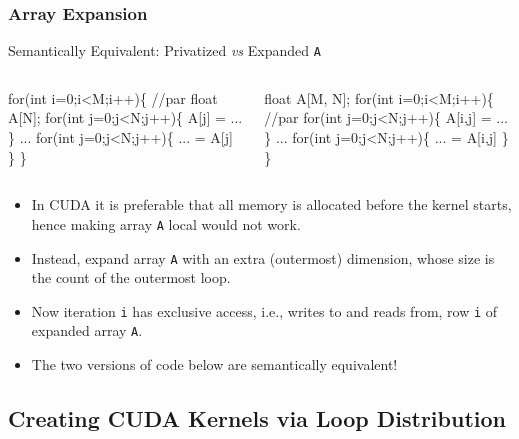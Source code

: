\documentclass{beamer}
\newcommand{\emp}[1]{\textcolor{DikuRed}{ #1}}
\newcommand{\emphh}[1]{\textcolor{CosGreen}{ #1}}
\begin{document}
\begin{frame}[fragile,t]
  \frametitle{Array Expansion} %

\vspace{-1ex}
\begin{block}{Semantically Equivalent: Privatized {\em vs} Expanded {\tt A}}
\begin{columns}
\begin{colorcode}
\emphh{for(int i=0;i<M;i++)\{ //par}
  \emp{float A[N];}
  for(int j=0;j<N;j++)\{
    \emp{A[j]} = ...
  \}
  ...
  for(int j=0;j<N;j++)\{
    ... = \emp{A[j]}
  \}  
\}
\end{colorcode}
\begin{colorcode}
\emphh{float A[M, N];}
\emphh{for(int i=0;i<M;i++)\{ //par}
  for(int j=0;j<N;j++)\{
    \emphh{A[i,j]} = ...
  \}
  ...
  for(int j=0;j<N;j++)\{
    ... = \emphh{A[i,j]}
  \}  
\}
\end{colorcode}
\end{columns}
\end{block} 

\begin{itemize}
\item In CUDA it is preferable that all memory is allocated
        before the kernel starts, hence making array {\tt A}
        local would not work.\smallskip

\item Instead, expand array {\tt A} with an extra (outermost) dimension,
        whose size is the count of the outermost loop. 

\item Now iteration {\tt i} has exclusive access, i.e., writes to and 
        reads from,  row {\tt i} of expanded array {\tt A}.

\item The two versions of code below are \emp{semantically equivalent!}
\end{itemize}


\end{frame}



\subsection{Creating CUDA Kernels via Loop Distribution}

\begin{frame}[fragile]
	\tableofcontents[currentsubsection]
\end{frame}
\end{document}
